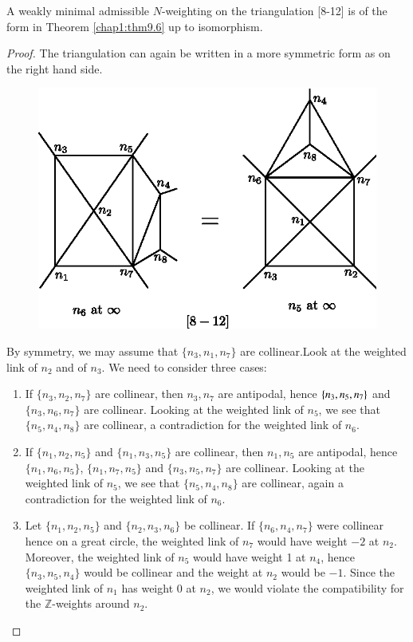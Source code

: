 \begin{lemma}[Nagaya]\label{chap1:lem9.19}
 A weakly minimal admissible $N$-weighting on the
  triangulation [8-12] is of the form in Theorem \ref{chap1:thm9.6} up to
  isomorphism. 
\end{lemma}

\begin{proof}
The triangulation can again be written in a more symmetric form as on
the right hand side.
\begin{figure}[H]
\centering 
\includegraphics[scale=0.75]{vol58-fig/fig58-54.eps} 
\end{figure}

By symmetry,  we may assume that $\{ n_3, n_1,
n_7 \}$ are collinear.\pageoriginale  Look at the weighted link of
$n_2$ and of $n_3$. We need to consider three cases:  
\begin{enumerate}
\item If $\{ n_3, n_2, n_7 \}$ are collinear,  then $n_3, n_7$ are
  antipodal, hence $\{ n_3, n_5,\break n_7 \}$ and $\{ n_3, n_6, n_7 \}$ are
  collinear.  Looking at the weighted link of $n_5$, we see that $\{
  n_5, n_4, n_8 \}$ are collinear,  a contradiction for the weighted
  link of $n_6$.  

\item If $\{ n_1, n_2, n_5 \}$ and $\{ n_1, n_3, n_5  \}$ are
  collinear,  then $n_1, n_5$ are antipodal, hence $\{ n_1, n_6, n_5
  \}$, $\{ n_1, n_7, n_5 \}$ and $\{ n_3, n_5, n_7 \}$ are collinear.
  Looking at the weighted link of $n_5$, we see that $\{ n_5, n_4, n_8
  \}$ are collinear, again a contradiction for the weighted link of
  $n_6$. 

\item Let $\{ n_1, n_2, n_5 \}$ and $\{ n_2, n_3, n_6 \}$ be
  collinear.  If $\{ n_6, n_4, n_7 \}$ were collinear hence on a great
  circle, the weighted link of $n_7$ would have weight $-2$ at
  $n_2$. Moreover, the weighted link of $n_5$ would have weight 1 at
  $n_4$, hence $\{ n_3, n_5, n_4 \}$ would be collinear and the weight
  at $n_2$ would be $-1$. Since the weighted link of $n_1$ has weight
  $0$ at $n_2$, we would violate the compatibility for the
  $\mathbb{Z}$-weights around $n_2$. 
\end{enumerate}
\end{proof}

